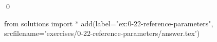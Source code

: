 
\begin{ex}
  \label{ex:0-22-reference-parameters}
  
  \qed
\end{ex}
\begin{python0}
from solutions import *
add(label="ex:0-22-reference-parameters",
    srcfilename='exercises/0-22-reference-parameters/answer.tex')
\end{python0}
